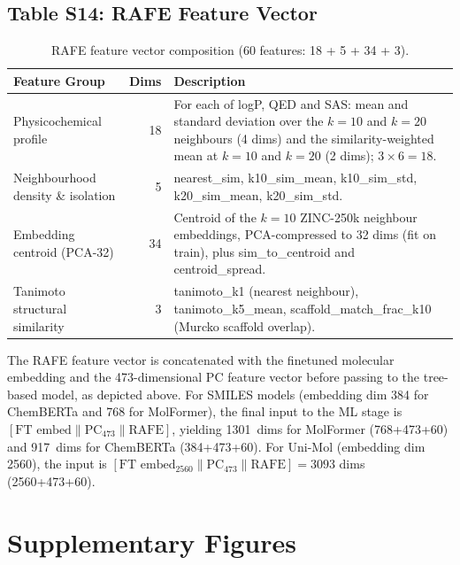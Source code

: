 \documentclass[9pt,a4paper]{article}
\begin{document}
\subsection*{Table S14: RAFE Feature Vector}

\begin{table}[h]
\centering
\caption{RAFE feature vector composition (60 features: 18 + 5 + 34 + 3).}
\label{tab:s4_rafe_features}
\begin{tabular}{lrp{8cm}}
\toprule
Feature Group & Dims & Description \\
\midrule
Physicochemical profile & 18 &
  For each of logP, QED and SAS: mean and standard deviation over the $k{=}10$ and $k{=}20$ neighbours (4 dims) and the similarity-weighted mean at $k{=}10$ and $k{=}20$ (2 dims); $3\times6=18$. \\
Neighbourhood density \& isolation & 5 &
  nearest\_sim, k10\_sim\_mean, k10\_sim\_std, k20\_sim\_mean, k20\_sim\_std. \\
Embedding centroid (PCA-32) & 34 &
  Centroid of the $k{=}10$ ZINC-250k neighbour embeddings, PCA-compressed to
  32 dims (fit on train), plus sim\_to\_centroid and centroid\_spread. \\
Tanimoto structural similarity & 3 &
  tanimoto\_k1 (nearest neighbour), tanimoto\_k5\_mean,
  scaffold\_match\_frac\_k10 (Murcko scaffold overlap). \\
\bottomrule
\end{tabular}
\end{table}
The RAFE feature vector is concatenated with the finetuned molecular embedding and the 473-dimensional PC feature vector before passing to the tree-based model, as depicted above.
For SMILES models (embedding dim 384 for ChemBERTa and 768 for MolFormer), the final input to the ML stage is
$[\text{FT embed} \| \text{PC}_{473} \| \text{RAFE}]$, yielding 1301~dims for
MolFormer (768+473+60) and 917~dims for ChemBERTa (384+473+60).
For Uni-Mol (embedding dim 2560), the input is
$[\text{FT embed}_{2560} \| \text{PC}_{473} \| \text{RAFE}] = 3093$ dims (2560+473+60).

\section*{Supplementary Figures}
\end{document}
